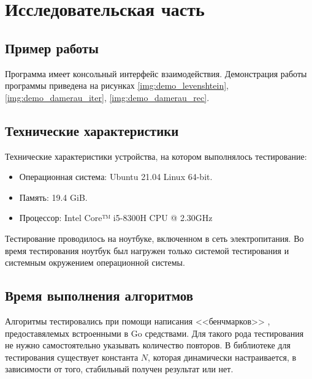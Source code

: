 \chapter{Исследовательская часть}

\section{Пример работы}

Программа имеет консольный интерфейс взаимодействия. Демонстрация работы программы приведена на рисунках
\ref{img:demo_levenshtein}, \ref{img:demo_damerau_iter}, \ref{img:demo_damerau_rec}.
\clearpage

\section{Технические характеристики}

Технические характеристики устройства, на котором выполнялось тестирование:

\begin{itemize}
	\item Операционная система: Ubuntu 21.04 \cite{ubuntu} Linux \cite{linux} 64-bit.
	\item Память: 19.4 GiB.
	\item Процессор: Intel Core™ i5-8300H \cite{intel} CPU @ 2.30GHz 
\end{itemize}

Тестирование проводилось на ноутбуке, включенном в сеть электропитания. Во время тестирования ноутбук был нагружен только системой тестирования и системным окружением операционной системы.

\section{Время выполнения алгоритмов}

Алгоритмы тестировались при помощи написания <<бенчмарков>> \cite{gotest}, предоставялемых встроенными в Go средствами. Для такого рода тестирования не нужно самостоятельно указывать количество повторов. В библиотеке для тестирования существует константа $N$, которая динамически настраивается, в зависимости от того, стабильный получен результат или нет.

